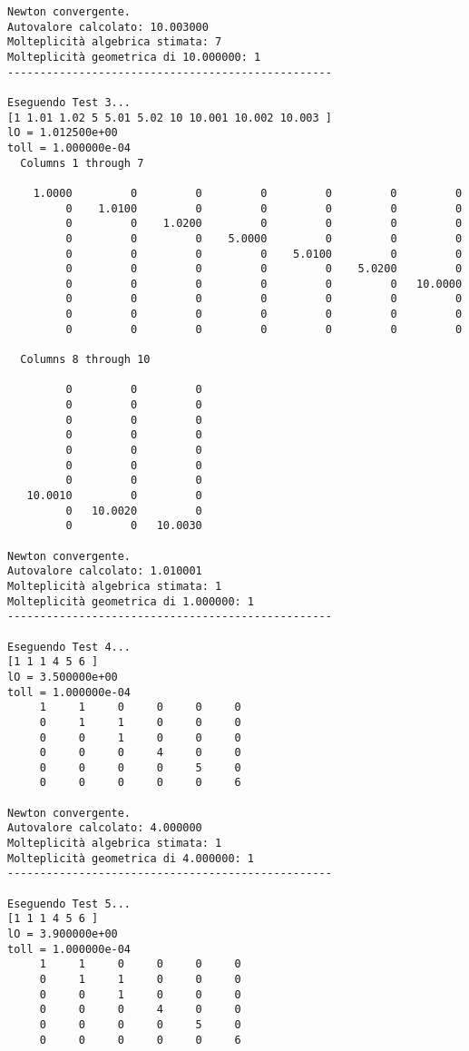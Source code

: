\documentclass[12pt]{article}
\begin{document}
\begin{verbatim}
Newton convergente.
Autovalore calcolato: 10.003000
Molteplicità algebrica stimata: 7
Molteplicità geometrica di 10.000000: 1
--------------------------------------------------

Eseguendo Test 3...
[1 1.01 1.02 5 5.01 5.02 10 10.001 10.002 10.003 ]
lO = 1.012500e+00
toll = 1.000000e-04
  Columns 1 through 7

    1.0000         0         0         0         0         0         0
         0    1.0100         0         0         0         0         0
         0         0    1.0200         0         0         0         0
         0         0         0    5.0000         0         0         0
         0         0         0         0    5.0100         0         0
         0         0         0         0         0    5.0200         0
         0         0         0         0         0         0   10.0000
         0         0         0         0         0         0         0
         0         0         0         0         0         0         0
         0         0         0         0         0         0         0

  Columns 8 through 10

         0         0         0
         0         0         0
         0         0         0
         0         0         0
         0         0         0
         0         0         0
         0         0         0
   10.0010         0         0
         0   10.0020         0
         0         0   10.0030

Newton convergente.
Autovalore calcolato: 1.010001
Molteplicità algebrica stimata: 1
Molteplicità geometrica di 1.000000: 1
--------------------------------------------------

Eseguendo Test 4...
[1 1 1 4 5 6 ]
lO = 3.500000e+00
toll = 1.000000e-04
     1     1     0     0     0     0
     0     1     1     0     0     0
     0     0     1     0     0     0
     0     0     0     4     0     0
     0     0     0     0     5     0
     0     0     0     0     0     6

Newton convergente.
Autovalore calcolato: 4.000000
Molteplicità algebrica stimata: 1
Molteplicità geometrica di 4.000000: 1
--------------------------------------------------

Eseguendo Test 5...
[1 1 1 4 5 6 ]
lO = 3.900000e+00
toll = 1.000000e-04
     1     1     0     0     0     0
     0     1     1     0     0     0
     0     0     1     0     0     0
     0     0     0     4     0     0
     0     0     0     0     5     0
     0     0     0     0     0     6


\end{verbatim}
\end{document}
